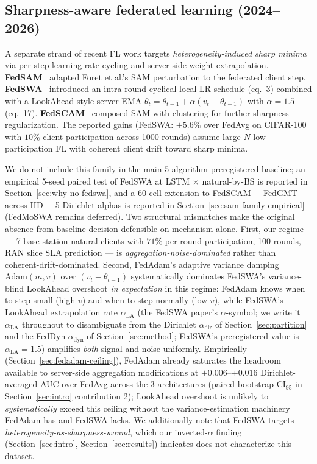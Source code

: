 \documentclass[journal]{IEEEtran}
\newcommand{\alphadir}{\ensuremath{\alpha_{\mathrm{dir}}}}
\newcommand{\alphadyn}{\ensuremath{\alpha_{\mathrm{dyn}}}}
\newcommand{\alphala}{\ensuremath{\alpha_{\mathrm{LA}}}}
\begin{document}
\subsection{Sharpness-aware federated learning (2024--2026)}\label{sec:related-sharp}

A separate strand of recent FL work targets \emph{heterogeneity-induced sharp minima} via per-step learning-rate cycling and server-side weight extrapolation. \textbf{FedSAM}~\cite{Caldarola2022_FedSAM} adapted Foret et al.'s SAM perturbation to the federated client step. \textbf{FedSWA}~\cite{Liu2025_FedSWA} introduced an intra-round cyclical local LR schedule (eq.~3) combined with a LookAhead-style server EMA $\theta_t = \theta_{t-1} + \alpha(v_t - \theta_{t-1})$ with $\alpha=1.5$ (eq.~17). \textbf{FedSCAM}~\cite{FedSCAM2026} composed SAM with clustering for further sharpness regularization. The reported gains (FedSWA: $+5.6\%$ over FedAvg on CIFAR-100 with $10\%$ client participation across 1000 rounds) assume large-$N$ low-participation FL with coherent client drift toward sharp minima.

We do not include this family in the main 5-algorithm preregistered baseline; an empirical 5-seed paired test of FedSWA at LSTM $\times$ natural-by-BS is reported in Section~\ref{sec:why-no-fedswa}, and a 60-cell extension to FedSCAM + FedGMT~\cite{FedGMT2025} across IID + 5 Dirichlet alphas is reported in Section~\ref{sec:sam-family-empirical} (FedMoSWA remains deferred). Two structural mismatches make the original absence-from-baseline decision defensible on mechanism alone. First, our regime --- 7 base-station-natural clients with $71\%$ per-round participation, 100 rounds, RAN slice SLA prediction --- is \emph{aggregation-noise-dominated} rather than coherent-drift-dominated. Second, FedAdam's adaptive variance damping $\mathrm{Adam}(m, v)$ over $(v_t - \theta_{t-1})$ systematically dominates FedSWA's variance-blind LookAhead overshoot \emph{in expectation} in this regime: FedAdam knows when to step small (high $v$) and when to step normally (low $v$), while FedSWA's LookAhead extrapolation rate $\alphala$ (the FedSWA paper's $\alpha$-symbol; we write it $\alphala$ throughout to disambiguate from the Dirichlet $\alphadir$ of Section~\ref{sec:partition} and the FedDyn $\alphadyn$ of Section~\ref{sec:method}; FedSWA's preregistered value is $\alphala=1.5$) amplifies \emph{both} signal and noise uniformly. Empirically (Section~\ref{sec:fedadam-ceiling}), FedAdam already saturates the headroom available to server-side aggregation modifications at $+0.006$--$+0.016$ Dirichlet-averaged AUC over FedAvg across the 3 architectures (paired-bootstrap CI$_{95}$ in Section~\ref{sec:intro} contribution 2); LookAhead overshoot is unlikely to \emph{systematically} exceed this ceiling without the variance-estimation machinery FedAdam has and FedSWA lacks. We additionally note that FedSWA targets \emph{heterogeneity-as-sharpness-wound}, which our inverted-$\alpha$ finding (Section~\ref{sec:intro}, Section~\ref{sec:results}) indicates does not characterize this dataset.
\end{document}
